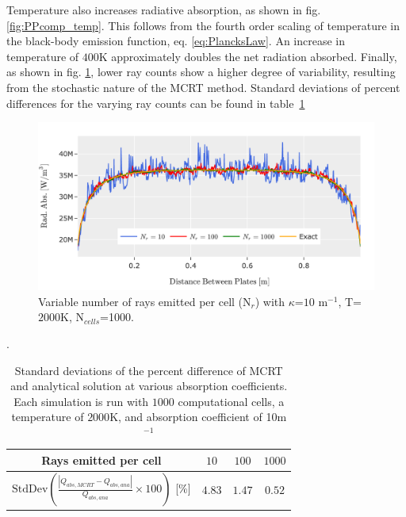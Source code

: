 Temperature also increases radiative absorption, as shown in fig. \ref{fig:PPcomp_temp}. This follows from the fourth order scaling of temperature in the black-body emission function, eq. \ref{eq:PlancksLaw}. An increase in temperature of $400$K approximately doubles the net radiation absorbed.
Finally, as shown in fig. \ref{fig:PPcom_nrays}, lower ray counts show a higher degree of variability, resulting from the stochastic nature of the MCRT method. Standard deviations of percent differences for the varying ray counts can be found in table~\ref{table:PPcomp_rayct}
\begin{figure}
\centering
\includegraphics[width=0.95\linewidth]{figures/ch4/PPcomparison3.png}
\caption{Variable number of rays emitted per cell (N$_r$) with $\kappa{}$=$10$ m$^{-1}$, T=$2000$K, N$_{cells}$=1000.}
\label{fig:PPcom_nrays}
\end{figure}


\begin{table}
\centering
\caption{Standard deviations of the percent difference of MCRT and analytical solution at various absorption coefficients. Each simulation is run with $1000$ computational cells, a temperature of $2000$K, and absorption coefficient of 10m$^{-1}$}.
\begin{tabular}{||c c c c||} 
 \hline
 Rays emitted per cell & $10$ & $100$ & $1000$ \\ [0.5ex] 
 \hline\hline
 $\text{StdDev}\left(\frac{|Q_{abs,MCRT}-Q_{abs,ana}|}{Q_{abs,ana}}\times{100}\right)$ [\%]& $4.83$ & $1.47$ & $0.52$ \\
 \hline
\end{tabular}
\label{table:PPcomp_rayct}
\end{table}

